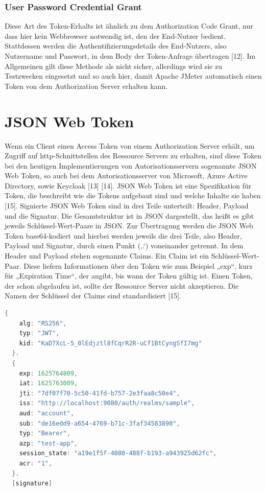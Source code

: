 \subsubsection{User Password Credential Grant}
\label{ssubsec:OAuth2:ErhaltvonToken:UserPasswordCredentialGrant}
Diese Art des Token-Erhalts ist ähnlich zu dem Authorization Code Grant, nur dass hier kein Webbrowser notwendig ist, den der End-Nutzer bedient. Stattdessen werden die Authentifizierungsdetails des End-Nutzers, also Nutzername und Passwort, in dem Body der Token-Anfrage übertragen [12]. Im Allgemeinen gilt diese Methode als nicht sicher, allerdings wird sie zu Testzwecken eingesetzt und so auch hier, damit Apache JMeter automatisch einen Token von dem Authorization Server erhalten kann.

\section{JSON Web Token}
\label{sec:JSONWebToken}
Wenn ein Client einen Access Token von einem Authorization Server erhält, um Zugriff auf http-Schnittstellen des Ressource Servers zu erhalten, sind diese Token bei den heutigen Implementierungen von Autorisationsservern sogenannte \ac{JSON} Web Token, so auch bei dem Autorisationsserver von Microsoft, Azure Active Directory, sowie Keycloak [13] [14]. 
JSON Web Token ist eine Spezifikation für Token, die beschreibt wie die Tokens aufgebaut sind und welche Inhalte sie haben [15].
Signierte JSON Web Token sind in drei Teile unterteilt: Header, Payload und die Signatur. Die Gesamtstruktur ist in JSON dargestellt, das heißt es gibt jeweils Schlüssel-Wert-Paare in JSON. Zur Übertragung werden die JSON Web Token base64-kodiert und hierbei werden jeweils die drei Teile, also Header, Payload und Signatur, durch einen Punkt (‚.‘) voneinander getrennt. 
In dem Header und Payload stehen sogenannte Claims. Ein Claim ist ein Schlüssel-Wert-Paar. Diese liefern Informationen über den Token wie zum Beispiel „exp“, kurz für „Expiration Time“, der angibt, bis wann der Token gültig ist. Einen Token, der schon abgelaufen ist, sollte der Ressource Server nicht akzeptieren. Die Namen der Schlüssel der Claims sind standardisiert [15]. 

\begin{lstlisting}[language=C++,frame=tb,caption={Beispiel JSON Web Token},label=lst:BeispielJSONWebToken]
  {
    alg: "RS256",
    typ: "JWT",
    kid: "KaD7XcL-5_0lEdjztl8fCqrR2R-uCf1BtCyngSfI7mg"
  }.
  {
    exp: 1625764809,
    iat: 1625763009,
    jti: "7df07f70-5c50-41fd-b757-2e3faa8c50e4",
    iss: "http://localhost:9080/auth/realms/sample",
    aud: "account",
    sub: "de16edd9-a654-4769-b71c-3faf34583890",
    typ: "Bearer",
    azp: "test-app",
    session_state: "a19e1f5f-4080-488f-b193-a943925d62fc",
    acr: "1",
  }.
  [signature]   
\end{lstlisting}

